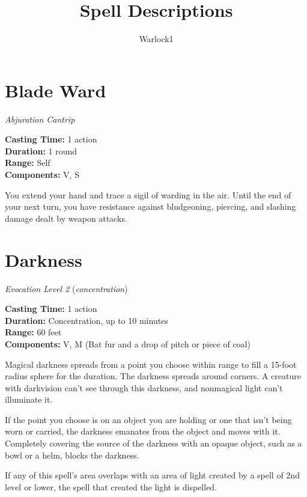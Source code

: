 \documentclass[twocolumn,lettersize]{article}
\title{Spell Descriptions}
\author{Warlock1}
\date{}
\begin{document}
\maketitle


  
    {
  

  \section*{Blade Ward}

    \textit{Abjuration Cantrip} %
             
  \noindent
  \textbf{Casting Time:} 1 action \\
  \textbf{Duration:} 1 round\\
  \textbf{Range:} Self \\
  \textbf{Components:} V, S 

  You extend your hand and trace a sigil of warding in the air. Until the end of 
    your next turn, you have resistance against bludgeoning, piercing, and slashing 
    damage dealt by weapon attacks.
    

  } %

  
    {
  

  \section*{Darkness}

    \textit{Evocation Level 2} %
    (\textit{concentration})%
             
  \noindent
  \textbf{Casting Time:} 1 action \\
  \textbf{Duration:} Concentration, up to 10 minutes\\
  \textbf{Range:} 60 feet \\
  \textbf{Components:} V, M (Bat fur and a drop of pitch or piece of coal) 

  Magical darkness spreads from a point you choose within range to fill a 15-foot 
    radius sphere for the duration.
    The darkness spreads around corners. A creature 
    with darkvision can't see through this darkness, and nonmagical light can't 
    illuminate it. 
    
    If the point you choose is on an object you are holding or one 
    that isn't being worn or carried, the darkness emanates from the object and 
    moves with it. Completely covering the source of the darkness with an opaque 
    object, such as a bowl or a helm, blocks the darkness.
    
    If any of this spell's 
    area overlaps with an area of light created by a spell of 2nd level or lower, 
    the spell that created the light is dispelled.
    

  } %
\end{document}
